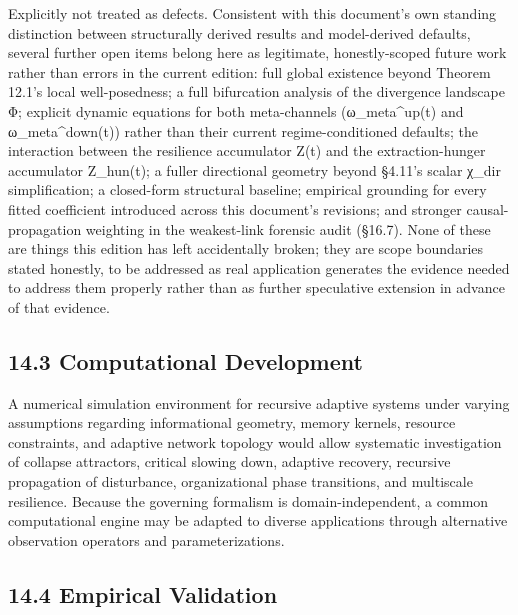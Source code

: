 \documentclass[
]{article}
\begin{document}
Explicitly not treated as defects. Consistent with this document's own
standing distinction between structurally derived results and
model-derived defaults, several further open items belong here as
legitimate, honestly-scoped future work rather than errors in the
current edition: full global existence beyond Theorem 12.1's local
well-posedness; a full bifurcation analysis of the divergence landscape
Φ; explicit dynamic equations for both meta-channels (ω\_meta\^{}up(t)
and ω\_meta\^{}down(t)) rather than their current regime-conditioned
defaults; the interaction between the resilience accumulator Z(t) and
the extraction-hunger accumulator Z\_hun(t); a fuller directional
geometry beyond §4.11's scalar χ\_dir simplification; a closed-form
structural baseline; empirical grounding for every fitted coefficient
introduced across this document's revisions; and stronger
causal-propagation weighting in the weakest-link forensic audit (§16.7).
None of these are things this edition has left accidentally broken; they
are scope boundaries stated honestly, to be addressed as real
application generates the evidence needed to address them properly
rather than as further speculative extension in advance of that
evidence.

\hypertarget{computational-development}{%
\subsection{14.3 Computational
Development}\label{computational-development}}

A numerical simulation environment for recursive adaptive systems under
varying assumptions regarding informational geometry, memory kernels,
resource constraints, and adaptive network topology would allow
systematic investigation of collapse attractors, critical slowing down,
adaptive recovery, recursive propagation of disturbance, organizational
phase transitions, and multiscale resilience. Because the governing
formalism is domain-independent, a common computational engine may be
adapted to diverse applications through alternative observation
operators and parameterizations.

\hypertarget{empirical-validation}{%
\subsection{14.4 Empirical Validation}\label{empirical-validation}}
\end{document}
